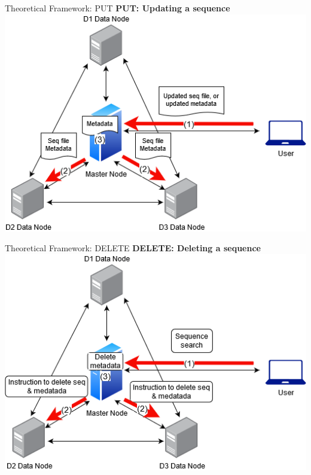 \documentclass{beamer}
\begin{document}
\begin{frame}{Theoretical Framework: PUT}
\textbf{PUT: Updating a sequence} \\ \medskip
\centering
\includegraphics[scale=0.5]{images/thesis1-Page-5.png}
\end{frame}

\begin{frame}{Theoretical Framework: DELETE}
\textbf{DELETE: Deleting a sequence} \\ \medskip
\centering
\includegraphics[scale=0.5]{images/thesis1-zzzzz.png}
\end{frame}
\end{document}
